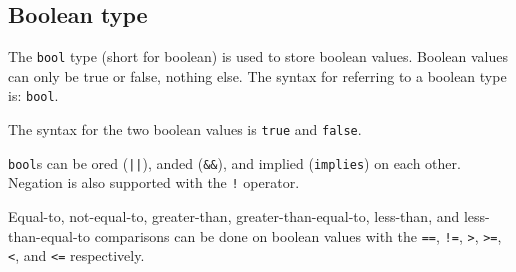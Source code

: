 
\subsection{Boolean type}
{
	The \texttt{bool} type (short for boolean) is used to store boolean values.
	Boolean values can only be true or false, nothing else.
	The syntax for referring to a boolean type is: \texttt{bool}.
	
	The syntax for the two boolean values is \texttt{true} and
	\texttt{false}.
	
	\texttt{bool}s can be ored (\texttt{||}),
	anded (\texttt{\&\&}), and implied (\texttt{implies})
	on each
	other. Negation is also supported
	with the \texttt{!} operator.
	
	Equal-to, not-equal-to, greater-than, greater-than-equal-to,
	less-than, and less-than-equal-to comparisons can be done
	on boolean values with
	the \texttt{==}, \texttt{!=},
	\texttt{>}, \texttt{>=}, \texttt{<}, and \texttt{<=} respectively.
}
